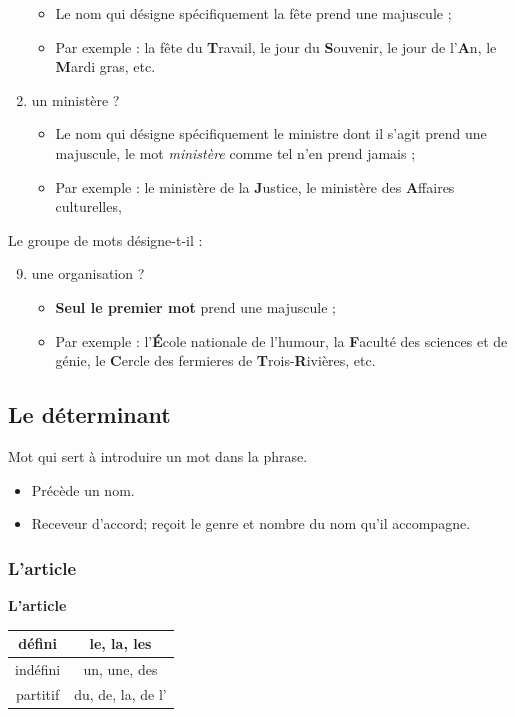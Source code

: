 \documentclass[10pt, french]{article}
\begin{document}
\begin{multicols*}{2}
\begin{enumerate}
		\begin{itemize}
		\item	Le nom qui désigne spécifiquement la fête prend une majuscule ;
		\item	Par exemple : la fête du \textbf{T}ravail, le jour du \textbf{S}ouvenir, le jour de l'\textbf{A}n, le \textbf{M}ardi gras, etc.
		\end{itemize}
	\item	un ministère ?
		\begin{itemize}
		\item	Le nom qui désigne spécifiquement le ministre dont il s'agit prend une majuscule, le mot \textit{ministère} comme tel n'en prend jamais ;
		\item	Par exemple : le ministère de la \textbf{J}ustice, le ministère des \textbf{A}ffaires culturelles, 
		\end{itemize}
\end{enumerate}

Le groupe de mots désigne-t-il :
\begin{enumerate}
	\setcounter{enumi}{8}
	\item	une organisation ?
		\begin{itemize}
		\item	\textbf{Seul le premier mot} prend une majuscule ;
		\item	Par exemple : l'\textbf{É}cole nationale de l'humour, la \textbf{F}aculté des sciences et de génie, le \textbf{C}ercle des fermieres de \textbf{T}rois-\textbf{R}ivières, etc.
		\end{itemize}
\end{enumerate}


\columnbreak
\subsection{Le déterminant}
\begin{definitionNOHFILL}[Le déterminant]
Mot qui sert à introduire un mot dans la phrase.\\

\begin{itemize}
	\item	Précède un nom.
	\item	Receveur d'accord; reçoit le genre et nombre du nom qu'il accompagne.
\end{itemize}
\end{definitionNOHFILL}


\subsubsection{L'article}
\textbf{L'article}
\begin{center}
\begin{tabular}{| >{\columncolor{airforceblue}}c | >{\columncolor{beaublue}}c  |}
\hline
défini	&	le, la, les	\\\hline
indéfini	&	un, une, des	\\\hline
partitif	&	du, de, la, de l'\\\hline
\end{tabular}
\end{center}


\end{multicols*}
\end{document}
